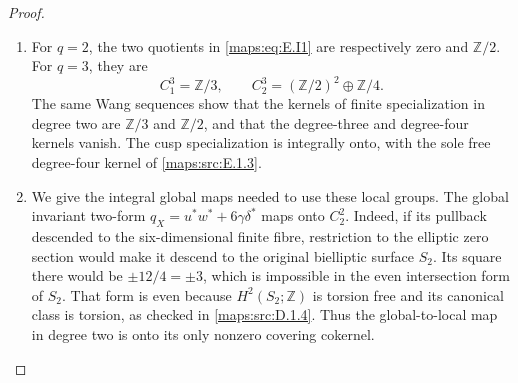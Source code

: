 \begin{proof}
\begin{enumerate}[label=\arabic*.,leftmargin=*]
\item For \(q=2\), the two quotients in \eqref{maps:eq:E.I1} are respectively zero
and \(\mathbb Z/2\). For \(q=3\), they are
\[
 C_1^3=\mathbb Z/3,\qquad
 C_2^3=(\mathbb Z/2)^2\oplus\mathbb Z/4.
 \tag{E.I2}\label{maps:eq:E.I2}
\]
The same Wang sequences show that the kernels of finite
specialization in degree two are \(\mathbb Z/3\) and
\(\mathbb Z/2\), and that the degree-three and degree-four
kernels vanish. The cusp specialization is integrally onto,
with the sole free degree-four kernel of \ref{maps:src:E.1.3}.

\item We give the integral global maps needed to use these local groups.
The global invariant two-form
\(q_X=u^*w^*+6\gamma\delta^*\) maps onto \(C_2^2\).
Indeed, if its pullback descended to the six-dimensional finite
fibre, restriction to the elliptic zero section would make it
descend to the original bielliptic surface \(S_2\). Its square
there would be \(\pm12/4=\pm3\), which is impossible in the
even intersection form of \(S_2\). That form is even because
\(H^2(S_2;\mathbb Z)\) is torsion free and its canonical class
is torsion, as checked in \ref{maps:src:D.1.4}. Thus the global-to-local map in
degree two is onto its only nonzero covering cokernel.


\end{enumerate}
\end{proof}
